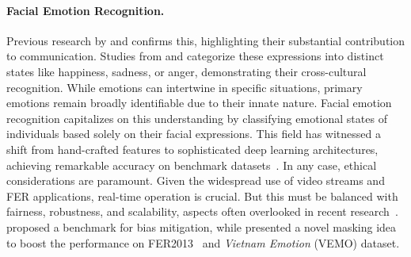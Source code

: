 \paragraph{Facial Emotion Recognition.}
Previous research by \citet{SamadianiHCLCXH19} and \citet{mehrabian2017communication} confirms this, 
highlighting their substantial contribution to communication. 
Studies from \citet{ekman1971constants} and \citet{LiD22a} categorize these expressions into distinct states 
like happiness, sadness, or anger, demonstrating their cross-cultural recognition. 
While emotions can intertwine in specific situations, 
primary emotions remain broadly identifiable due to their innate nature.
Facial emotion recognition capitalizes on this understanding by classifying emotional states of individuals based solely on their facial expressions. 
This field has witnessed a shift from hand-crafted features to sophisticated deep learning architectures, 
achieving remarkable accuracy on benchmark datasets~\cite{FardM22,LiGL22}. 
In any case, ethical considerations are paramount. 
Given the widespread use of video streams and FER applications, 
real-time operation is crucial. 
But this must be balanced with fairness, robustness, and scalability, 
aspects often overlooked in recent research~\cite{Savchenko22}. 
\citet{WangQKGNHR20} proposed a benchmark for bias mitigation, 
while \citet{PhamVT20} presented a novel masking idea to boost the performance on FER2013~\cite{BarsoumZCZ16} and \textit{Vietnam Emotion} (VEMO) dataset. 

